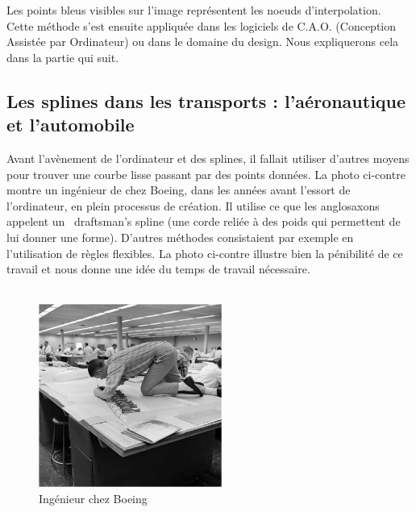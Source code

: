 \documentclass{article}
\begin{document}
Les points bleus visibles sur l'image repr\'{e}sentent les noeuds d'interpolation.\\

Cette m\'{e}thode s'est ensuite appliqu\'{e}e dans les logiciels de C.A.O. (Conception Assist\'{e}e par Ordinateur) ou dans le domaine du design. Nous expliquerons cela dans la partie qui suit.

\newpage
\begin{huge}
\subsection{Les splines dans les transports : l'a\'eronautique et l'automobile}
\end{huge}

Avant l'av\`{e}nement de l'ordinateur et des splines, il fallait utiliser d'autres moyens pour trouver une courbe lisse passant par des points donn\'{e}es. La photo ci-contre montre un ing\'{e}nieur de chez Boeing, dans les ann\'{e}es avant l'essort de l'ordinateur, en plein processus de cr\'{e}ation. Il utilise ce que les anglosaxons appelent un \guillemotleft \ draftsman's spline \guillemotright (une corde reli\'{e}e \`a des poids qui permettent de lui donner une forme). D'autres m\'{e}thodes consistaient par exemple en l'utilisation de r\`{e}gles flexibles. La photo ci-contre illustre bien la p\'{e}nibilit\'{e} de ce travail et nous donne une id\'{e}e du temps de travail n\'{e}cessaire.\\\\

\begin{figure}[h]
	\centering
	\includegraphics[width=6cm]{SplineTransport.png}
	\caption{Ing\'enieur chez Boeing}
\end{figure}
\end{document}
